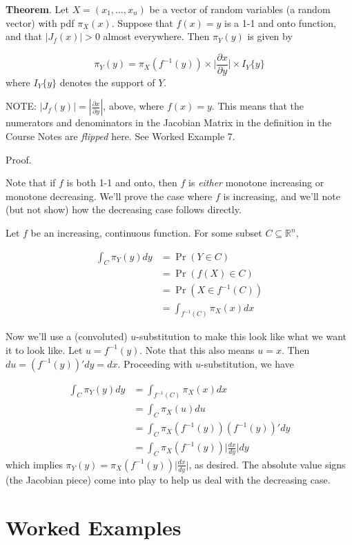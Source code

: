 \documentclass[
  letterpaper,
  DIV=11,
  numbers=noendperiod]{scrreprt}
\begin{document}
\textbf{Theorem}. Let \(X = (x_1, \dots, x_n)\) be a vector of random
variables (a random vector) with pdf \(\pi_{X}(x)\). Suppose that
\(f(x) = y\) is a 1-1 and onto function, and that \(|J_f(x)| > 0\)
almost everywhere. Then \(\pi_Y(y)\) is given by

\[
\pi_Y(y) = \pi_{X}(f^{-1}(y)) \times \bigg| \frac{\partial x}{\partial y} \bigg| \times I_Y\{y\}
\] where \(I_Y \{y \}\) denotes the support of \(Y\).

NOTE: \(| J_f(y) | = | \frac{\partial x}{\partial y} |\), above, where
\(f(x) = y\). This means that the numerators and denominators in the
Jacobian Matrix in the definition in the Course Notes are \emph{flipped}
here. See Worked Example 7.

Proof.

Note that if \(f\) is both 1-1 and onto, then \(f\) is \emph{either}
monotone increasing or monotone decreasing. We'll prove the case where
\(f\) is increasing, and we'll note (but not show) how the decreasing
case follows directly.

Let \(f\) be an increasing, continuous function. For some subset
\(C \subseteq \mathbb{R}^n\),

\begin{align*}
\int_C \pi_Y(y) dy & = \Pr(Y \in C) \\
& = \Pr(f(X) \in C) \\
& = \Pr(X \in f^{-1}(C)) \\
& = \int_{f^{-1}(C)} \pi_X(x) dx 
\end{align*}

Now we'll use a (convoluted) \(u\)-substitution to make this look like
what we want it to look like. Let \(u = f^{-1}(y)\). Note that this also
means \(u = x\). Then \(du = (f^{-1}(y))' dy = dx\). Proceeding with
\(u\)-substitution, we have

\begin{align*}
\int_C \pi_Y(y) dy & = \int_{f^{-1}(C)} \pi_X(x) dx \\
& = \int_C \pi_X(u) du \\
& = \int_C \pi_X(f^{-1}(y)) (f^{-1}(y))' dy \\
& = \int_C \pi_X(f^{-1}(y)) 
\bigg| \frac{dx}{dy} \bigg| dy 
\end{align*} which implies \(\pi_Y(y) = \pi_X(f^{-1}(y))
\bigg| \frac{dx}{dy} \bigg|\), as desired. The absolute value signs (the
Jacobian piece) come into play to help us deal with the decreasing case.

\section{Worked Examples}\label{worked-examples}
\end{document}
